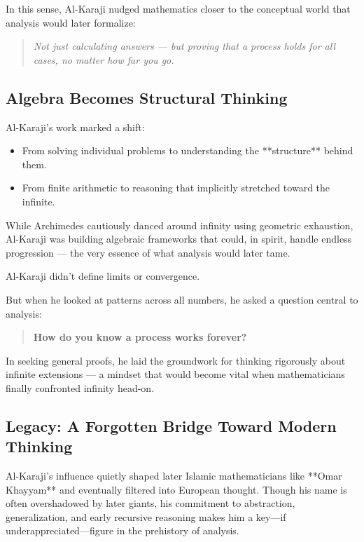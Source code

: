 In this sense, Al-Karaji nudged mathematics closer to the conceptual world that analysis would later formalize:

\begin{quote}
\textit{Not just calculating answers — but proving that a process holds for all cases, no matter how far you go.}
\end{quote}

\subsection{Algebra Becomes Structural Thinking}

Al-Karaji’s work marked a shift:

\begin{itemize}
  \item From solving individual problems to understanding the **structure** behind them.
  \item From finite arithmetic to reasoning that implicitly stretched toward the infinite.
\end{itemize}

While Archimedes cautiously danced around infinity using geometric exhaustion, Al-Karaji was building algebraic frameworks that could, in spirit, handle endless progression — the very essence of what analysis would later tame.

\begin{tcolorbox}[colback=blue!5!white, colframe=blue!50!black, title={Al-Karaji: The Algebraist Who Thought Like an Analyst}]
Al-Karaji didn’t define limits or convergence.

But when he looked at patterns across all numbers, he asked a question central to analysis:

\begin{quote}
\textbf{How do you know a process works forever?}
\end{quote}

In seeking general proofs, he laid the groundwork for thinking rigorously about infinite extensions — a mindset that would become vital when mathematicians finally confronted infinity head-on.
\end{tcolorbox}

\subsection{Legacy: A Forgotten Bridge Toward Modern Thinking}

Al-Karaji’s influence quietly shaped later Islamic mathematicians like **Omar Khayyam** and eventually filtered into European thought. Though his name is often overshadowed by later giants, his commitment to abstraction, generalization, and early recursive reasoning makes him a key—if underappreciated—figure in the prehistory of analysis.

